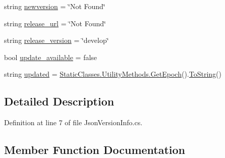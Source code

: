 \begin{DoxyCompactItemize}
\item 
string \mbox{\hyperlink{class_little_weeb_library_1_1_models_1_1_json_version_info_a08d3b36c375a460b440678f84bdb64ee}{newversion}} = \char`\"{}Not Found\char`\"{}
\item 
string \mbox{\hyperlink{class_little_weeb_library_1_1_models_1_1_json_version_info_a6ef07d4fd20affb8de244417395e791d}{release\+\_\+url}} = \char`\"{}Not Found\char`\"{}
\item 
string \mbox{\hyperlink{class_little_weeb_library_1_1_models_1_1_json_version_info_aeb4d9fe589655ec2dacff95ffcae154b}{release\+\_\+version}} = \char`\"{}develop\char`\"{}
\item 
bool \mbox{\hyperlink{class_little_weeb_library_1_1_models_1_1_json_version_info_aad6b40e255e38ff875f9b4093a5a76b4}{update\+\_\+available}} = false
\item 
string \mbox{\hyperlink{class_little_weeb_library_1_1_models_1_1_json_version_info_a4da32a9d061542e9dd0302fa439e9913}{updated}} = \mbox{\hyperlink{class_little_weeb_library_1_1_static_classes_1_1_utility_methods_a12336d9e64983ddabaad8950486fafb2}{Static\+Classes.\+Utility\+Methods.\+Get\+Epoch}}().\mbox{\hyperlink{class_little_weeb_library_1_1_models_1_1_json_version_info_a72efae30c86f1e6baaef42065127bdd2}{To\+String}}()
\end{DoxyCompactItemize}


\subsection{Detailed Description}


Definition at line 7 of file Json\+Version\+Info.\+cs.



\subsection{Member Function Documentation}
\mbox{\label{class_little_weeb_library_1_1_models_1_1_json_version_info_a79b72a4b31accba79e2fbf1ca93297c4}} 
